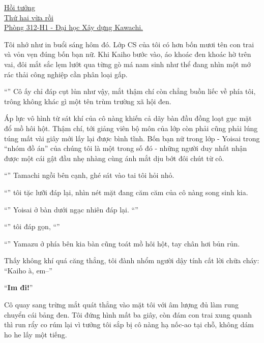 \documentclass[../main.tex]{subfiles}
\begin{document}
\begin{center}
  \uline{Hồi tưởng\\Thứ hai vừa rồi\\Phòng 312-H1 - Đại học Xây dựng Kawachi.}
\end{center}

Tôi nhớ như in buổi sáng hôm đó. Lớp CS của tôi có hơn bốn mươi tên con trai và vỏn vẹn đúng bốn bạn nữ. Khi Kaiho bước vào, áo khoác đen khoác hờ trên vai, đôi mắt sắc lẹm lướt qua từng gò má nam sinh như thể đang nhìn một mớ rác thải công nghiệp cần phân loại gấp.

``'' Cô ấy chỉ đáp cụt lủn như vậy, mắt thậm chí còn chẳng buồn liếc về phía tôi, trông không khác gì một tên trùm trường xã hội đen.

Áp lực vô hình từ sát khí của cô nàng khiến cả dãy bàn đầu đồng loạt gục mặt đổ mồ hôi hột. Thậm chí, tới giảng viên bộ môn của lớp còn phải cũng phải lúng túng mất vài giây mới lấy lại được bình tĩnh. Bốn bạn nữ trong lớp - Yoisai trong ``nhóm đồ án'' của chúng tôi là một trong số đó - những người duy nhất nhận được một cái gật đầu nhẹ nhàng cùng ánh mắt dịu bớt đôi chút từ cô.

``'' Tamachi ngồi bên cạnh, ghé sát vào tai tôi hỏi nhỏ.

``'' tôi tặc lưỡi đáp lại, nhìn nét mặt đang căm căm của cô nàng song sinh kia.

``'' Yoisai ở bàn dưới ngạc nhiên đáp lại. ``''

``'' tôi đáp gọn, ``''

``'' Yamazu ở phía bên kia bàn cũng toát mồ hôi hột, tay chân hơi bủn rủn.

Thấy không khí quá căng thẳng, tôi đành nhổm người dậy tính cất lời chữa cháy: ``Kaiho à, em--''

``\textbf{Im đi!}''

Cô quay sang trừng mắt quát thẳng vào mặt tôi với âm lượng đủ làm rung chuyển cái bảng đen. Tôi đứng hình mất ba giây, còn đám con trai xung quanh thì run rẩy co rúm lại vì tưởng tôi sắp bị cô nàng hạ nốc-ao tại chỗ, không dám ho he lấy một tiếng.
\end{document}
